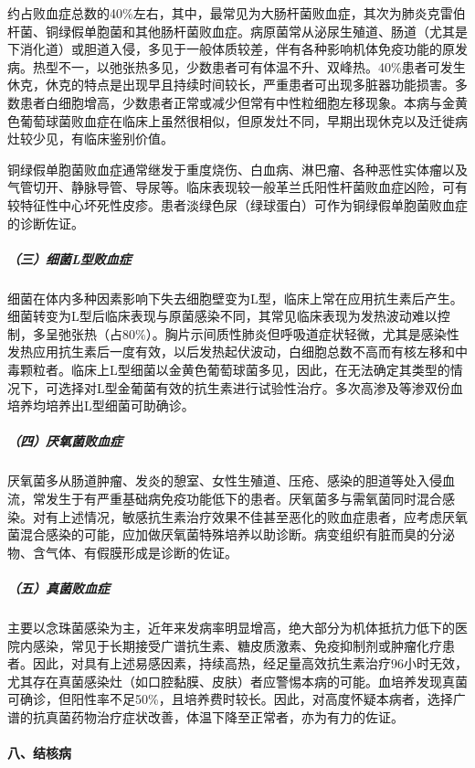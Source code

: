 约占败血症总数的40\%左右，其中，最常见为大肠杆菌败血症，其次为肺炎克雷伯杆菌、铜绿假单胞菌和其他肠杆菌败血症。病原菌常从泌尿生殖道、肠道（尤其是下消化道）或胆道入侵，多见于一般体质较差，伴有各种影响机体免疫功能的原发病。热型不一，以弛张热多见，少数患者可有体温不升、双峰热。40\%患者可发生休克，休克的特点是出现早且持续时间较长，严重患者可出现多脏器功能损害。多数患者白细胞增高，少数患者正常或减少但常有中性粒细胞左移现象。本病与金黄色葡萄球菌败血症在临床上虽然很相似，但原发灶不同，早期出现休克以及迁徙病灶较少见，有临床鉴别价值。

铜绿假单胞菌败血症通常继发于重度烧伤、白血病、淋巴瘤、各种恶性实体瘤以及气管切开、静脉导管、导尿等。临床表现较一般革兰氏阳性杆菌败血症凶险，可有较特征性中心坏死性皮疹。患者淡绿色尿（绿球蛋白）可作为铜绿假单胞菌败血症的诊断佐证。

\subparagraph{（三）细菌L型败血症}

细菌在体内多种因素影响下失去细胞壁变为L型，临床上常在应用抗生素后产生。细菌转变为L型后临床表现与原菌感染不同，其常见临床表现为发热波动难以控制，多呈弛张热（占80\%）。胸片示间质性肺炎但呼吸道症状轻微，尤其是感染性发热应用抗生素后一度有效，以后发热起伏波动，白细胞总数不高而有核左移和中毒颗粒者。临床上L型细菌以金黄色葡萄球菌多见，因此，在无法确定其类型的情况下，可选择对L型金葡菌有效的抗生素进行试验性治疗。多次高渗及等渗双份血培养均培养出L型细菌可助确诊。

\subparagraph{（四）厌氧菌败血症}

厌氧菌多从肠道肿瘤、发炎的憩室、女性生殖道、压疮、感染的胆道等处入侵血流，常发生于有严重基础病免疫功能低下的患者。厌氧菌多与需氧菌同时混合感染。对有上述情况，敏感抗生素治疗效果不佳甚至恶化的败血症患者，应考虑厌氧菌混合感染的可能，应加做厌氧菌特殊培养以助诊断。病变组织有脏而臭的分泌物、含气体、有假膜形成是诊断的佐证。

\subparagraph{（五）真菌败血症}

主要以念珠菌感染为主，近年来发病率明显增高，绝大部分为机体抵抗力低下的医院内感染，常见于长期接受广谱抗生素、糖皮质激素、免疫抑制剂或肿瘤化疗患者。因此，对具有上述易感因素，持续高热，经足量高效抗生素治疗96小时无效，尤其存在真菌感染灶（如口腔黏膜、皮肤）者应警惕本病的可能。血培养发现真菌可确诊，但阳性率不足50\%，且培养费时较长。因此，对高度怀疑本病者，选择广谱的抗真菌药物治疗症状改善，体温下降至正常者，亦为有力的佐证。

\paragraph{八、结核病}

